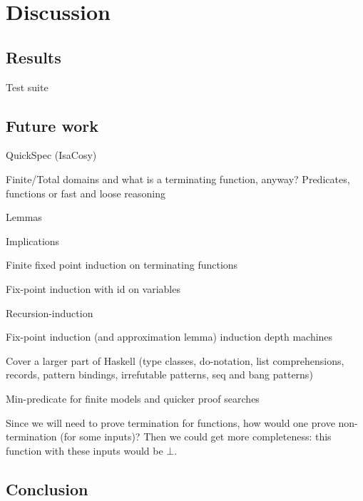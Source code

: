 \documentclass{report}
\begin{document}








\chapter{Discussion}

\section{Results}

Test suite

\section{Future work}

QuickSpec (IsaCosy)

Finite/Total domains and what is a terminating function, anyway?
Predicates, functions or fast and loose reasoning \cite{fastandloose}

Lemmas

Implications

Finite fixed point induction on terminating functions

Fix-point induction with id on variables

Recursion-induction

Fix-point induction (and approximation lemma) induction depth machines

Cover a larger part of Haskell (type classes, do-notation, list
comprehensions, records, pattern bindings, irrefutable patterns, seq
and bang patterns)

Min-predicate for finite models and quicker proof searches

Since we will need to prove termination for functions, how would one
prove non-termination (for some inputs)? Then we could get more
completeness: this function with these inputs would be $\bot$.

\section{Conclusion}




\end{document}
